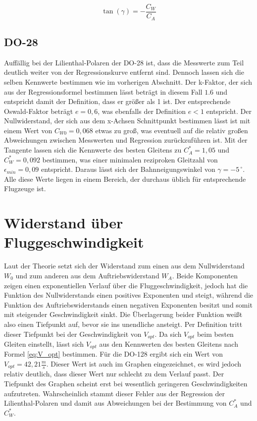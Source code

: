 \begin{equation}
\tan\left(\gamma\right)=-\frac{C_W}{C_A}
\label{Bahn}
\end{equation}

\subsection{DO-28}

Auffällig bei der Lilienthal-Polaren der DO-28 ist, dass die Messwerte zum Teil deutlich weiter von der Regressionskurve entfernt sind. Dennoch lassen sich die selben Kennwerte bestimmen wie im vorherigen Abschnitt. 
Der k-Faktor, der sich aus der Regressionsformel bestimmen lässt beträgt in diesem Fall $1.6$ und entspricht damit der Definition, dass er größer als 1 ist. Der entsprechende Oswald-Faktor beträgt $e = 0,6$, was ebenfalls der Definition $e<1$ entspricht. 
Der Nullwiderstand, der sich aus dem x-Achsen Schnittpunkt bestimmen lässt ist mit einem Wert von $C_{W0} = 0,068$ etwas zu groß, was eventuell auf die relativ großen Abweichungen zwischen Messwerten und Regression zurückzuführen ist.
Mit der Tangente lassen sich die Kennwerte des besten Gleitens zu $C_A^* = 1,05$ und $C_W^* = 0,092$ bestimmen, was einer minimalen reziproken Gleitzahl von $\epsilon_{min} = 0,09$ entspricht. Daraus lässt sich der Bahnneigungswinkel von $\gamma = -5^{\ \circ}$. Alle diese Werte liegen in einem Bereich, der durchaus üblich für entsprechende Flugzeuge ist.


\section{Widerstand über Fluggeschwindigkeit}
Laut der Theorie setzt sich der Widerstand zum einen aus dem Nullwiderstand $W_0$ und zum anderen aus dem Auftriebswiderstand $W_A$. Beide Komponenten zeigen einen exponentiellen Verlauf über die Fluggeschwindigkeit, jedoch hat die Funktion des Nullwiderstands einen positives Exponenten und steigt, während die Funktion des Auftriebswiderstands einen negativen Exponenten besitzt und somit mit steigender Geschwindigkeit sinkt. Die Überlagerung beider Funktion weißt also einen Tiefpunkt auf, bevor sie ins unendliche ansteigt. Per Definition tritt dieser Tiefpunkt bei der Geschwindigkeit von $V_{opt}$. Da sich $V_{opt}$ beim besten Gleiten einstellt, lässt sich $V_{opt}$ aus den Kennwerten des besten Gleitens nach Formel \ref{eq:V_opt} bestimmen. Für die DO-128 ergibt sich ein Wert von $V_{opt} = 42,21 \frac{m}{s}$. Dieser Wert ist auch im Graphen eingezeichnet, es wird jedoch relativ deutlich, dass dieser Wert nur schlecht zu dem Verlauf passt. Der Tiefpunkt des Graphen scheint erst bei wesentlich geringeren Geschwindigkeiten aufzutreten. Wahrscheinlich stammt dieser Fehler aus der Regression der Lilienthal-Polaren und damit aus Abweichungen bei der Bestimmung von $C_A^*$ und $C_W^*$.

